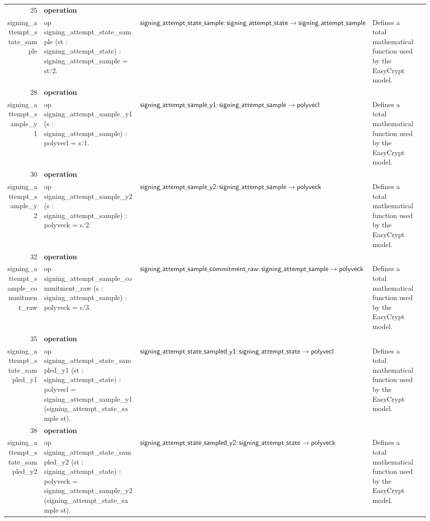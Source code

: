 \documentclass[10pt]{article}
\newcommand{\ec}[1]{\begingroup\ttfamily\scriptsize #1\endgroup}
\begin{document}
\begin{longtable}{r L{0.17\textwidth} L{0.26\textwidth} L{0.27\textwidth} L{0.20\textwidth}}
25 & \textbf{operation}\\\ec{signing\_attempt\_state\_sample} & \ec{op signing\_attempt\_state\_sample (st : signing\_attempt\_state) : signing\_attempt\_sample = st.`2.} & \(\mathsf{signing\_attempt\_state\_sample} : \mathsf{signing\_attempt\_state} \to \mathsf{signing\_attempt\_sample}\) & Defines a total mathematical function used by the EasyCrypt model. \\
28 & \textbf{operation}\\\ec{signing\_attempt\_sample\_y1} & \ec{op signing\_attempt\_sample\_y1 (s : signing\_attempt\_sample) : polyvecl = s.`1.} & \(\mathsf{signing\_attempt\_sample\_y1} : \mathsf{signing\_attempt\_sample} \to \mathsf{polyvecl}\) & Defines a total mathematical function used by the EasyCrypt model. \\
30 & \textbf{operation}\\\ec{signing\_attempt\_sample\_y2} & \ec{op signing\_attempt\_sample\_y2 (s : signing\_attempt\_sample) : polyveck = s.`2.} & \(\mathsf{signing\_attempt\_sample\_y2} : \mathsf{signing\_attempt\_sample} \to \mathsf{polyveck}\) & Defines a total mathematical function used by the EasyCrypt model. \\
32 & \textbf{operation}\\\ec{signing\_attempt\_sample\_commitment\_raw} & \ec{op signing\_attempt\_sample\_commitment\_raw (s : signing\_attempt\_sample) : polyveck = s.`3.} & \(\mathsf{signing\_attempt\_sample\_commitment\_raw} : \mathsf{signing\_attempt\_sample} \to \mathsf{polyveck}\) & Defines a total mathematical function used by the EasyCrypt model. \\
35 & \textbf{operation}\\\ec{signing\_attempt\_state\_sampled\_y1} & \ec{op signing\_attempt\_state\_sampled\_y1 (st : signing\_attempt\_state) : polyvecl = signing\_attempt\_sample\_y1 (signing\_attempt\_state\_sample st).} & \(\mathsf{signing\_attempt\_state\_sampled\_y1} : \mathsf{signing\_attempt\_state} \to \mathsf{polyvecl}\) & Defines a total mathematical function used by the EasyCrypt model. \\
38 & \textbf{operation}\\\ec{signing\_attempt\_state\_sampled\_y2} & \ec{op signing\_attempt\_state\_sampled\_y2 (st : signing\_attempt\_state) : polyveck = signing\_attempt\_sample\_y2 (signing\_attempt\_state\_sample st).} & \(\mathsf{signing\_attempt\_state\_sampled\_y2} : \mathsf{signing\_attempt\_state} \to \mathsf{polyveck}\) & Defines a total mathematical function used by the EasyCrypt model. \\

\end{longtable}
\end{document}
